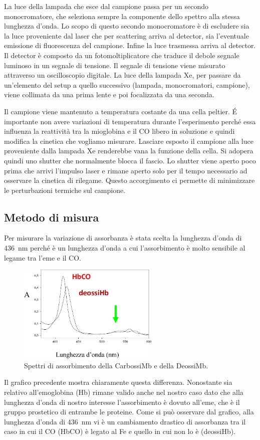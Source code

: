 \documentclass[11pt, a4paper]{article}
\begin{document}
La luce della lampada che esce dal campione passa per un secondo monocromatore, che seleziona sempre la componente dello spettro alla stessa lunghezza d'onda.
Lo scopo di questo secondo monocromatore è di escludere sia la luce proveniente dal laser che per scattering arriva al detector, sia l'eventuale emissione di fluorescenza del campione.
Infine la luce trasmessa arriva al detector. Il detector è composto da un fotomoltiplicatore che traduce il debole segnale luminoso in un segnale di tensione.
Il segnale di tensione viene misurato attraverso un oscilloscopio digitale.
La luce della lampada Xe, per passare da un'elemento del setup a quello successivo (lampada, monocromatori, campione), viene collimata da una prima lente e poi focalizzata da una seconda.

Il campione viene mantenuto a temperatura costante da una cella peltier. \'E importante non avere variazioni di temperatura durante l'esperimento perché essa influenza la reattività
tra la mioglobina e il CO libero in soluzione e quindi modifica la cinetica che vogliamo misurare. Lasciare esposto il campione alla luce proveniente dalla lampada Xe renderebbe vana
la funzione della cella. Si adopera quindi uno shutter che normalmente blocca il fascio. Lo shutter viene aperto poco prima che arrivi l'impulso laser e rimane aperto solo per il tempo necessario
ad osservare la cinetica di rilegame. Questo accorgimento ci permette di minimizzare le perturbazioni termiche sul campione.

\subsection{Metodo di misura}

Per misurare la variazione di assorbanza è stata scelta la lunghezza d'onda di \qty{436}{\nano\meter} perché è un lunghezza d'onda a cui l'assorbimento è molto sensibile al legame tra l'eme e il CO.

\begin{figure}[H]
    \centering
    \includegraphics[width=0.6\textwidth]{abs_Mb_cropped.png}
    \caption{Spettri di assorbimento della CarbossiMb e della DeossiMb.}
\end{figure}
Il grafico precedente mostra chiaramente questa differenza. Nonostante sia relativo all'emoglobina (Hb) rimane valido anche nel nostro caso dato che alla lunghezza d'onda di nostro interesse l'assorbimento è dovuto all'eme, che è il gruppo prostetico di entrambe le proteine.
Come si può osservare dal grafico, alla lunghezza d'onda di \qty{436}{\nano\meter} vi è un cambiamento drastico di assorbanza tra il caso in cui il CO (HbCO) è legato al Fe e quello in cui non lo è (deossiHb).
\end{document}
